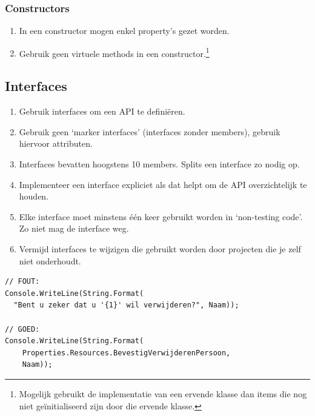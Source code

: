 \documentclass[a4paper,11pt]{article}
\begin{document}
\subsubsection{Constructors}
\begin{enumerate}[resume]
\item In een constructor mogen enkel property's gezet worden.
\item Gebruik geen virtuele methods in een constructor.\footnote{Mogelijk
gebruikt de implementatie van een ervende klasse dan items die nog niet
ge\"initialiseerd zijn door die ervende klasse.}
\end{enumerate}



\subsection{Interfaces}
\begin{enumerate}[resume]
\addtocounter{enumi}{1}
\item Gebruik interfaces om een API te defini\"eren.
\item Gebruik geen `marker interfaces' (interfaces zonder members), gebruik
hiervoor attributen.
\item Interfaces bevatten hoogstens 10 members.  Splits een interface
zo nodig op.
\item Implementeer een interface expliciet als dat helpt om de API
overzichtelijk te houden.
\item Elke interface moet minstens \'e\'en keer gebruikt worden in
`non-testing code'.  Zo niet mag de interface weg.
\item Vermijd interfaces te wijzigen die gebruikt worden door projecten die je zelf niet onderhoudt.
\end{enumerate}


\begin{lstlisting}[float,caption=Geen letterlijke strings,label=lstStrLit]
// FOUT:
Console.WriteLine(String.Format(
  "Bent u zeker dat u '{1}' wil verwijderen?", Naam));

// GOED:
Console.WriteLine(String.Format(
	Properties.Resources.BevestigVerwijderenPersoon,
	Naam));
\end{lstlisting}
\end{document}
